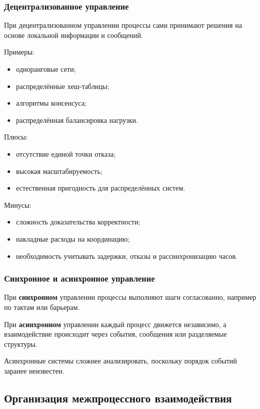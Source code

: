 \documentclass[12pt,a4paper]{article}
\begin{document}
\subsubsection{Децентрализованное управление}

При децентрализованном управлении процессы сами принимают решения на основе локальной информации и сообщений.

Примеры:
\begin{itemize}
    \item одноранговые сети;
    \item распределённые хеш-таблицы;
    \item алгоритмы консенсуса;
    \item распределённая балансировка нагрузки.
\end{itemize}

Плюсы:
\begin{itemize}
    \item отсутствие единой точки отказа;
    \item высокая масштабируемость;
    \item естественная пригодность для распределённых систем.
\end{itemize}

Минусы:
\begin{itemize}
    \item сложность доказательства корректности;
    \item накладные расходы на координацию;
    \item необходимость учитывать задержки, отказы и рассинхронизацию часов.
\end{itemize}

\subsubsection{Синхронное и асинхронное управление}

При \textbf{синхронном} управлении процессы выполняют шаги согласованно, например по тактам или барьерам.

При \textbf{асинхронном} управлении каждый процесс движется независимо, а взаимодействие происходит через события, сообщения или разделяемые структуры.

Асинхронные системы сложнее анализировать, поскольку порядок событий заранее неизвестен.

\subsection{Организация межпроцессного взаимодействия}
\end{document}
